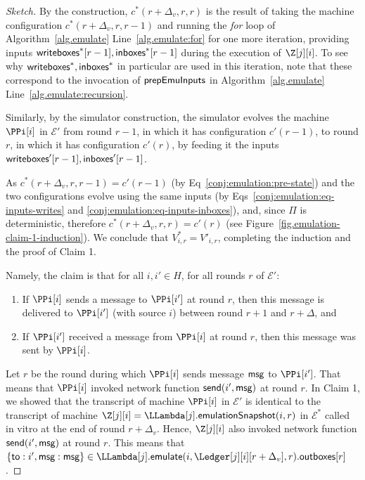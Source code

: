 \begin{proof}[Sketch]
  By the \rollerblade construction,
  $c^*(r + \Delta_v, r, r)$ is the result of
  taking the machine configuration
  $c^*(r + \Delta_v, r, r - 1)$
  and running the \emph{for} loop of Algorithm~\ref{alg.emulate} Line~\ref{alg.emulate:for}
  for one more iteration, providing inputs $\textsf{writeboxes}^*[r - 1], \textsf{inboxes}^*[r - 1]$
  during the execution of $\Z[j][i]$.
  To see why $\textsf{writeboxes}^*, \textsf{inboxes}^*$ in particular are used in this iteration,
  note that these correspond to the invocation of $\textsf{prepEmuInputs}$ in
  Algorithm~\ref{alg.emulate} Line~\ref{alg.emulate:recursion}.

  Similarly, by the simulator construction, %
  the simulator evolves the machine $\PPi[i]$ in $\mathcal{E}'$ from round $r - 1$,
  in which it has configuration $c'(r - 1)$,
  to round $r$,
  in which it has configuration $c'(r)$,
  by feeding it the inputs $\textsf{writeboxes}'[r - 1], \textsf{inboxes}'[r - 1]$.

  As $c^*(r + \Delta_v, r, r - 1) = c'(r - 1)$ (by Eq~\ref{conj:emulation:pre-state})
  and the two configurations evolve using the same inputs (by
  Eqs~\ref{conj:emulation:eq-inputs-writes} and \ref{conj:emulation:eq-inputs-inboxes}),
  and, since $\Pi$ is deterministic,
  therefore $c^*(r + \Delta_v, r, r) = c'(r)$ (see Figure~\ref{fig.emulation-claim-1-induction}).
  We conclude that $V^*_{i,r} = V'_{i,r}$, completing the induction
  and the proof of Claim 1.

  Namely, the claim is that for all $i, i' \in H$, for all rounds $r$ of $\mathcal{E}'$:

  \begin{enumerate}[label=(\alph*)]
    \item
    \label{conj:emulation:claim-delta}
    If $\PPi[i]$ sends a message to $\PPi[i']$ at round $r$, then this message is delivered to $\PPi[i']$
    (with source $i$) between round $r + 1$ and $r + \Delta$, and

    \item
    If $\PPi[i']$ received a message from $\PPi[i]$ at round $r$, then this message was sent by $\PPi[i]$.
  \end{enumerate}

  Let $r$ be the round during which $\PPi[i]$ sends message $\textsf{msg}$ to $\PPi[i']$.
  That means that $\PPi[i]$ invoked network function $\textsf{send}(i', \textsf{msg})$ at round $r$.
  In Claim 1, we showed that the transcript of machine $\PPi[i]$ in $\mathcal{E}'$
  is identical to the transcript of machine $\Z[j][i] = \LLambda[j].\emulationSnapshot(i,r)$ in $\mathcal{E}^*$
  called in vitro at the end of round $r + \Delta_v$.
  Hence, $\Z[j][i]$ also invoked network function $\textsf{send}(i', \textsf{msg})$ at round $r$.
  This means that $\{\textsf{to}: i', \msg: \msg\} \in \LLambda[j].\emulate(i, \Ledger[j][i][r + \Delta_v], r).\outboxes[r]$.


\end{proof}
